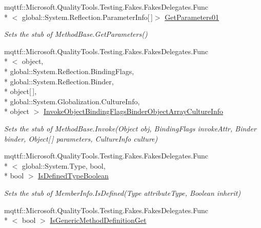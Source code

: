 \begin{DoxyCompactItemize}
mqttf\-::\-Microsoft.\-Quality\-Tools.\-Testing.\-Fakes.\-Fakes\-Delegates.\-Func\\*
$<$ global\-::\-System.\-Reflection.\-Parameter\-Info\mbox{[}$\,$\mbox{]}$>$ \hyperlink{class_system_1_1_reflection_1_1_fakes_1_1_stub_method_info_abbfb01cb3e7e875b3157caa46a2f4512}{Get\-Parameters01}
\begin{DoxyCompactList}\small\item\em Sets the stub of Method\-Base.\-Get\-Parameters()\end{DoxyCompactList}\item 
mqttf\-::\-Microsoft.\-Quality\-Tools.\-Testing.\-Fakes.\-Fakes\-Delegates.\-Func\\*
$<$ object, \\*
global\-::\-System.\-Reflection.\-Binding\-Flags, \\*
global\-::\-System.\-Reflection.\-Binder, \\*
object\mbox{[}$\,$\mbox{]}, \\*
global\-::\-System.\-Globalization.\-Culture\-Info, \\*
object $>$ \hyperlink{class_system_1_1_reflection_1_1_fakes_1_1_stub_method_info_a0a9db65c0802419fdf5cc3586e4a0720}{Invoke\-Object\-Binding\-Flags\-Binder\-Object\-Array\-Culture\-Info}
\begin{DoxyCompactList}\small\item\em Sets the stub of Method\-Base.\-Invoke(\-Object obj, Binding\-Flags invoke\-Attr, Binder binder, Object\mbox{[}$\,$\mbox{]} parameters, Culture\-Info culture)\end{DoxyCompactList}\item 
mqttf\-::\-Microsoft.\-Quality\-Tools.\-Testing.\-Fakes.\-Fakes\-Delegates.\-Func\\*
$<$ global\-::\-System.\-Type, bool, \\*
bool $>$ \hyperlink{class_system_1_1_reflection_1_1_fakes_1_1_stub_method_info_a7b88fb15bf8bb104a26b7a41131b7030}{Is\-Defined\-Type\-Boolean}
\begin{DoxyCompactList}\small\item\em Sets the stub of Member\-Info.\-Is\-Defined(\-Type attribute\-Type, Boolean inherit)\end{DoxyCompactList}\item 
mqttf\-::\-Microsoft.\-Quality\-Tools.\-Testing.\-Fakes.\-Fakes\-Delegates.\-Func\\*
$<$ bool $>$ \hyperlink{class_system_1_1_reflection_1_1_fakes_1_1_stub_method_info_a17ddec5cbcd2b72cba0d6f7f4278d4bf}{Is\-Generic\-Method\-Definition\-Get}

\end{DoxyCompactItemize}
